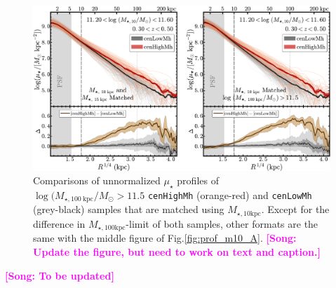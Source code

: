 \documentclass{emulateapj}
\def\rbcg{\texttt{cenHighMh}}
\def\nbcg{\texttt{cenLowMh}}
\def\minn{{$M_{\star,10\mathrm{kpc}}$}}
\def\mtot{{$M_{\star,100\mathrm{kpc}}$}}
\def\mden{{$\mu_{\star}$}}
\newcommand{\song}[1]{\textcolor{magenta}{\textbf{[Song: #1]}}}
\begin{document}
\begin{CJK*}{UTF8}{gbsn}
 
  \begin{figure}[t]
      \centering 
      \includegraphics[width=\textwidth]{fig/redbcg_prof_4}
      \caption{Comparisons of unnormalized \mden{} profiles of 
      	  $\log (M_{\star,100\ \mathrm{kpc}}/M_{\odot}>11.5$ \rbcg{} (orange-red) 
      	  and \nbcg{} (grey-black) samples that are matched using \minn{}.
          Except for the difference in \mtot{}-limit of both samples, other formats are 
          the same with the middle figure of Fig.\ref{fig:prof_m10_A}.
          \song{Update the figure, but need to work on text and caption.}
          }
      \label{fig:prof_m10_B}
  \end{figure}
     
\clearpage


\song{To be updated}



\end{CJK*}

\clearpage 

\label{lastpage}
\end{document}
